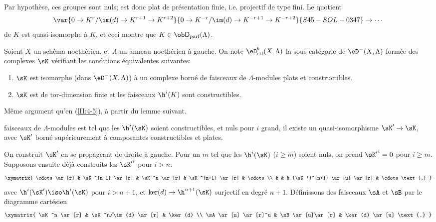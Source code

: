 Par hypothèse, ces groupes sont nuls;  est donc plat de 
présentation finie, i.e. projectif de type fini. Le quotient 
\[
  \var{0 \to K^r/\im(d) \to K^{r+1} \to K^{r+2}}{0 \to K^{-r}/\im(d) \to K^{-r+1} \to K^{-r+2}}{S45-SOL-0347}\to \cdots 
\]
de $K$ est quasi-isomorphe à $K$, et ceci montre que 
$K\in\ob\mathsf{D}_\text{parf}(\Lambda)$. 





\begin{prop-def_}\label{II:4-6}
Soient $X$ un schéma noethérien, et $\Lambda$ un anneau noethérien à 
gauche. On note $\eD_\textnormal{ctf}^b(X,\Lambda)$ la sous-catégorie de 
$\eD^-(X,\Lambda)$ formée des complexes $\sK$ vérifiant les conditions 
équivalentes suivantes:
\begin{enumerate}[\indent i)]
  \item $\sK$ est isomorphe (dans $\eD^-(X,\Lambda)$) à un complexe borné de 
    faisceaux de $\Lambda$-modules plats et constructibles. 
  \item $\sK$ est de tor-dimension finie et les faisceaux $\h^i(K)$ sont 
    constructibles. 
\end{enumerate}
\end{prop-def_}

Même argument qu'en (\ref{II:4-5}), à partir du lemme suivant. 





\begin{lemma_}\label{II:4-7}
 faisceaux de $\Lambda$-modules est tel que les 
$\h^i(\sK)$ soient constructibles, et nuls pour $i$ grand, il existe un 
quasi-isomorphisme $\sK'\to \sK$, avec $\sK'$ borné supérieurement à 
composantes constructibles et plates.
\end{lemma_}

On construit $\sK'$ en se propageant de droite à gauche. Pour un $m$ tel que les 
$\h^i(\sK)$ ($i\geqslant m$) soient nuls, on prend ${\sK'}^i = 0$ pour 
$i\geqslant m$. Supposons ensuite déjà construits les ${\sK'}^i$ pour 
$i>n$:
\[\xymatrix{
  \cdots \ar[r] 
    & \sK^{n-1} \ar[r] 
    & \sK^n \ar[r] 
    & \sK^{n+1} \ar[r] 
    & \cdots \\
  & & & {\sK'}^{n+1} \ar[u] \ar[r] 
    & \cdots \text{,}
}\]
avec $\h^i(\sK')\iso \h^i(\sK)$ pour $i>n+1$, et $\ker(d)\to\h^{n+1}(\sK)$ surjectif 
en degré $n+1$. Définissons des faisceaux $\sA$ et $\sB$ par le diagramme 
cartésien 
\[\xymatrix{
  \sK^n \ar[r] 
    & \sK^n/\im(d) \ar[r] 
    & \ker(d) \\
  \sA \ar[u] \ar[r]^u 
    & \sB \ar[u]\ar[r] 
    & \ker(d) \ar[u] \text{.}
}\]

